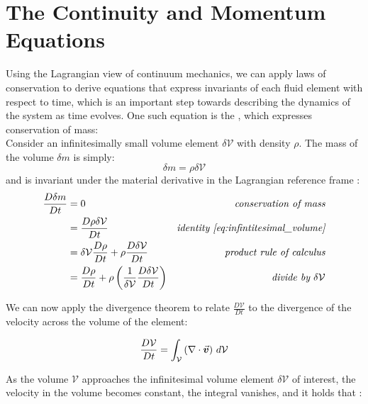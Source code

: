 \section{The Continuity and Momentum Equations}
Using the Lagrangian view of continuum mechanics, we can apply laws of conservation to derive equations that express invariants of each fluid element with respect to time, which is an important step towards describing the dynamics of the system as time evolves. One such equation is the , which expresses conservation of mass:\\
Consider an infinitesimally small volume element $\delta \mathcal{V}$ with density $\rho$. The mass of the volume $\delta m$ is simply\autocite*{anderson}:
\begin{equation}\delta m = \rho \delta\mathcal{V}\label{eq:infintitesimal_volume}\end{equation}
and is invariant under the material derivative in the Lagrangian reference frame \autocite*{anderson}:
\begin{align}
  \frac{D\delta m}{D t} & = 0                                                                                                 & \textit{conservation of mass}                     \\
                        & = \frac{D \rho \delta\mathcal{V}}{Dt}                                                               & \textit{identity \ref*{eq:infintitesimal_volume}} \\
                        & = \delta\mathcal{V} \frac{D \rho}{Dt} + \rho \frac{D \delta\mathcal{V}}{Dt}                         & \textit{product rule of calculus}                 \\\label{eq:cont-eq-unfinished}
                        & =  \frac{D \rho}{Dt} + \rho \left(\frac{1}{\delta\mathcal{V}} \frac{D \delta\mathcal{V}}{Dt}\right) & \textit{divide by $\delta \mathcal{V}$}
\end{align}

We can now apply the divergence theorem to relate $\frac{D\mathcal{V}}{D t}$ to the divergence of the velocity across the volume of the element:

\begin{equation}\label{eq:div-theorem}
  \frac{D\mathcal{V}}{D t} = \int_{\mathcal{V}} \left( \nabla\cdot \vec{\bm{v}}\right)\,d\mathcal{V}
\end{equation}

As the volume $\mathcal{V}$ approaches the infinitesimal volume element $\delta \mathcal{V}$ of interest, the velocity in the volume becomes constant, the integral vanishes, and it holds that \autocite*{anderson}:


